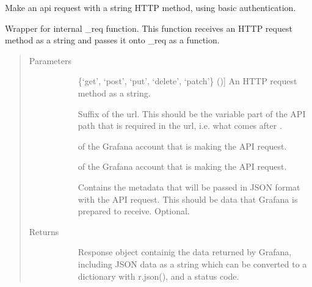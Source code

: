 \documentclass[letterpaper,10pt,english]{sphinxmanual}
\begin{document}
\begin{fulllineitems}
\label{\detokenize{grafanaAPI:grafanaAPI.request}}
Make an api request with a string HTTP method, using basic authentication.

Wrapper for internal \_req function. This function receives an HTTP request
method as a string and passes it onto \_req as a function.
\begin{quote}\begin{description}
\item[{Parameters}] \leavevmode\begin{description}
\item[{}] \leavevmode{[}\{‘get’, ‘post’, ‘put’, ‘delete’, ‘patch’\} (){]}
An HTTP request method as a string.

\item[{}] \leavevmode{[}\sphinxtitleref{str}{]}
Suffix of the url. This should be the variable part of the API path that is
required in the url, i.e. what comes after .

\item[{}] \leavevmode{[}\sphinxtitleref{str}{]}
 of the Grafana account that is making the API request.

\item[{}] \leavevmode{[}\sphinxtitleref{str}{]}
 of the Grafana account that is making the API request.

\item[{}] \leavevmode{[}\sphinxtitleref{dict}{]}
Contains the metadata that will be passed in JSON format with the API
request. This should be data that Grafana is prepared to receive. Optional.

\end{description}

\item[{Returns}] \leavevmode\begin{description}
\item[{}] \leavevmode{[}\sphinxtitleref{requests.Response}{]}
Response object containig the data returned by Grafana, including JSON data
as a string which can be converted to a dictionary with r.json(), and a
status code.


\end{description}
\end{description}
\end{quote}
\end{fulllineitems}
\end{document}
